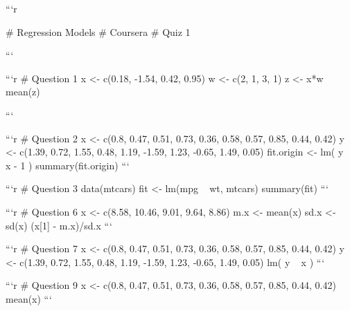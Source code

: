 


```{r}

# Regression Models
# Coursera
# Quiz 1

```





```{r}
# Question 1
x <- c(0.18, -1.54, 0.42, 0.95)
w <- c(2, 1, 3, 1)
z <- x*w
mean(z)

```





```{r}
# Question 2
x <- c(0.8, 0.47, 0.51, 0.73, 0.36, 0.58, 0.57, 0.85, 0.44, 0.42)
y <- c(1.39, 0.72, 1.55, 0.48, 1.19, -1.59, 1.23, -0.65, 1.49, 0.05)
fit.origin <- lm( y ~ x - 1 )
summary(fit.origin)
```





```{r}
# Question 3
data(mtcars)
fit <- lm(mpg ~ wt, mtcars)
summary(fit)
```





```{r}
# Question 6
x <- c(8.58, 10.46, 9.01, 9.64, 8.86)
m.x <- mean(x)
sd.x <- sd(x)
(x[1] - m.x)/sd.x
```





```{r}
# Question 7
x <- c(0.8, 0.47, 0.51, 0.73, 0.36, 0.58, 0.57, 0.85, 0.44, 0.42)
y <- c(1.39, 0.72, 1.55, 0.48, 1.19, -1.59, 1.23, -0.65, 1.49, 0.05)
lm( y ~ x )
```





```{r}
# Question 9
x <- c(0.8, 0.47, 0.51, 0.73, 0.36, 0.58, 0.57, 0.85, 0.44, 0.42)
mean(x)
```


